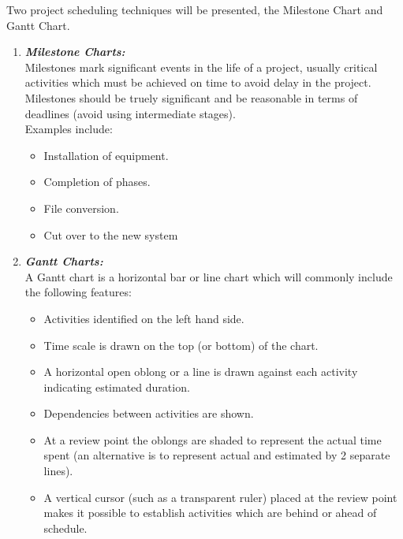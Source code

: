Two project scheduling techniques will be presented, the Milestone Chart and Gantt Chart.
\begin{enumerate}
\item \textbf{\emph{Milestone Charts:}}\\
Milestones mark significant events in the life of a project, usually critical activities which must be achieved on time to avoid delay in the project. Milestones should be truely significant and be reasonable in terms of deadlines (avoid using intermediate stages).
\\
Examples include:
\begin{itemize}
\item Installation of equipment.
\item Completion of phases.
\item File conversion.
\item Cut over to the new system
\end{itemize}

\item \textbf{\emph{Gantt Charts:}}\\
A Gantt chart is a horizontal bar or line chart which will commonly include the following features:
\begin{itemize}
\item Activities identified on the left hand side.
\item Time scale is drawn on the top (or bottom) of the chart.
\item A horizontal open oblong or a line is drawn against each activity indicating estimated duration.
\item Dependencies between activities are shown.
\item At a review point the oblongs are shaded to represent the actual time spent (an alternative is to represent actual and estimated by 2 separate lines).
\item A vertical cursor (such as a transparent ruler) placed at the review point makes it possible to establish activities which are behind or ahead of schedule.
\end{itemize}
\end{enumerate}

